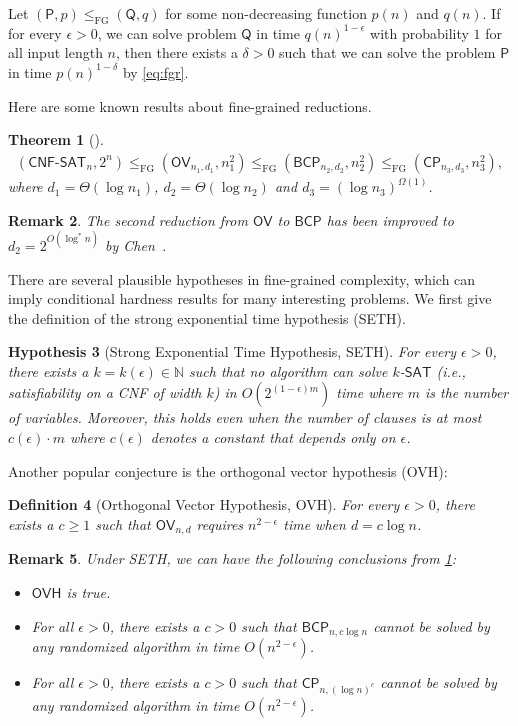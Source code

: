 \documentclass[10pt,a4paper]{article}
\newtheorem{theorem}{Theorem}
\newtheorem{definition}[theorem]{Definition}
\newtheorem{remark}[theorem]{Remark}
\newtheorem{hypothesis}[theorem]{Hypothesis}
\newcommand{\eps}{\epsilon}
\newcommand{\N}{\mathbb{N}}
\renewcommand{\eps}{\epsilon}
\newcommand{\FG}{\mathrm{FG}}
\newcommand{\CP}{\ensuremath{\mathsf{CP}}}
\newcommand{\OV}{\ensuremath{\mathsf{OV}}}
\newcommand{\OVH}{\ensuremath{\mathsf{OVH}}}
\newcommand{\SAT}{\ensuremath{\mathsf{SAT}}}
\newcommand{\BCP}{\ensuremath{\mathsf{BCP}}}
\begin{document}
Let $(\mathsf{P},p)\leq_{\FG} (\mathsf{Q},q)$ for some non-decreasing function $p(n)$ and $q(n)$. If for every $\eps > 0$, we can solve problem $\mathsf{Q}$ in time $q(n)^{1-\epsilon}$ with probability $1$ for all input length $n$, then there exists a $\delta>0$ such that we can solve the problem $\mathsf{P}$ in time $p(n)^{1-\delta}$ 
by \cref{eq:fgr}.

Here are some known results about fine-grained reductions.
\begin{theorem}[\cite{r29,r49}]\label{thm:classical_fg}
\begin{align}
    (\mathsf{CNF\text{-}SAT}_{n},2^n)\leq_{\FG} (\OV_{n_1,d_1},n_1^2)\leq_{\FG} (\BCP_{n_2,d_2},n_2^2)\leq_{\FG} (\CP_{n_3,d_3},n_3^2),
\end{align}
where $d_1=\Theta(\log n_1)$, $d_2=\Theta(\log n_2)$ and $d_3=(\log  n_3)^{\Omega(1)}$.
\end{theorem}

\begin{remark}
The second reduction from $\OV$ to $\BCP$ has been improved to $d_2 = 2^{O(\log^* n)}$ by Chen~\cite{r17}.
\end{remark}

There are several plausible hypotheses in fine-grained complexity, which can imply conditional hardness results for many interesting problems. We first give the definition of the strong exponential time hypothesis (SETH). 
\begin{hypothesis}[Strong Exponential Time Hypothesis, \textsf{SETH}]
For every $\epsilon > 0$, there exists a $k = k(\epsilon) \in \N$ such that no algorithm can solve $k$-$\SAT$ (i.e., satisfiability on a CNF of width $k$) in $O(2^{(1 - \epsilon)m})$ time where $m$ is the number of variables. Moreover, this holds even when the number of clauses is at most $c(\epsilon) \cdot m$ where $c(\epsilon)$ denotes a constant that depends only on $\epsilon$.
\end{hypothesis}

Another popular conjecture is the orthogonal vector hypothesis (\textsf{OVH}):
\begin{definition}[Orthogonal Vector Hypothesis, \textsf{OVH}]
For every $\epsilon > 0$,  
there exists a $c\ge 1$ such that $\OV_{n,d}$ requires $n^{2-\epsilon}$ time when $d=c\log n$.
\end{definition}

\begin{remark}
Under SETH, we can have the following conclusions from \cref{thm:classical_fg}: 
\begin{itemize}
    \item $\OVH$ is true. 
    \item For all $\epsilon>0$, there exists a $c>0$ such that $\BCP_{n,c\log n}$ cannot be solved by any randomized algorithm in time $O(n^{2-\epsilon})$.
    \item For all $\epsilon>0$, there exists a $c>0$ such that $\CP_{n,(\log n)^c}$ cannot be solved by any randomized algorithm in time $O(n^{2-\epsilon})$.
\end{itemize}
\end{remark}
\end{document}
